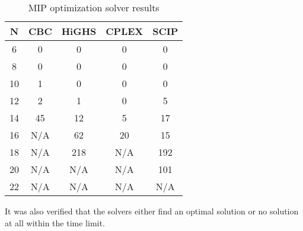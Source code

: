 \begin{table}[htbp]
\centering
\small
{%
\begin{tabular}{|c|c|c|c|c|}
\toprule
\textbf{N} & \textbf{CBC} &\textbf{HiGHS} & \textbf{CPLEX} & \textbf{SCIP} \\
\midrule
6 & 0 & 0 & 0 & 0 \\
8 & 0 & 0 & 0 & 0 \\
10 & 1 & 0 & 0 & 0 \\
12 & 2 & 1 & 0 & 5 \\
14 & 45 & 12 & 5 & 17\\
16 & N/A & 62 & 20 & 15\\
18 & N/A & 218 & N/A & 192\\
20 & N/A & N/A & N/A & 101\\
22 & N/A & N/A & N/A & N/A\\
\bottomrule
\end{tabular}
}
\caption{MIP optimization solver results}
\label{table:mip-results}
\end{table}

It was also verified that the solvers either find an optimal solution or no solution at all within the time limit.